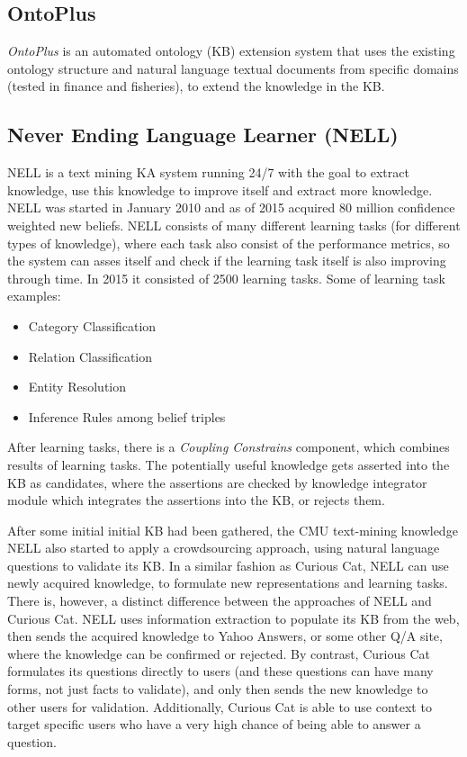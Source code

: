 \subsection{OntoPlus}
\label{section:r:ontoplus}
\emph{OntoPlus} is an automated ontology (KB) extension system that uses the 
existing ontology structure and natural language textual documents from specific
domains (tested in finance and fisheries), to extend the knowledge in the KB.

\subsection{Never Ending Language Learner (NELL)}
\label{section:r:nell}
NELL\parencite{Mitchell2015} is a text mining KA system running 24/7 with the
goal to extract knowledge, use this knowledge to improve itself and extract
more knowledge. NELL was started in January 2010 and as of 2015 acquired
80 million confidence weighted new beliefs. NELL consists of many different
learning tasks (for different types of knowledge), where each task also consist
of the performance metrics, so the system can asses itself and check if the 
learning task itself is also improving through time. In 2015 it consisted of
2500 learning tasks. Some of learning task examples:
\begin{itemize}
	\item Category Classification
	\item Relation Classification
	\item Entity Resolution
	\item Inference Rules among belief triples
\end{itemize}
After learning tasks, there is a \emph{Coupling Constrains} component, which
combines results of learning tasks. The potentially useful knowledge gets
asserted into the KB as candidates, where the assertions are checked by knowledge
integrator module which integrates the assertions into the KB, or rejects them.

After some initial initial KB had been gathered, the CMU text-mining knowledge 
NELL also started to apply a crowdsourcing approach\parencite{Pedro2012a},
using natural language questions to validate its KB. In a similar
fashion as Curious Cat, NELL can use newly acquired knowledge, to 
formulate new representations and learning tasks. There is, however, a 
distinct difference between the approaches of NELL and Curious Cat. 
NELL uses information extraction to populate its KB from the web, 
then sends the acquired knowledge to Yahoo Answers, or some other Q/A site, 
where the knowledge can be confirmed or rejected. 
By contrast, Curious Cat formulates its questions directly to users 
(and these questions can have many forms, not just facts to validate), 
and only then sends the new knowledge to other users for validation. 
Additionally, Curious Cat is able to use context to target specific users who 
have a very high chance of being able to answer a question.

